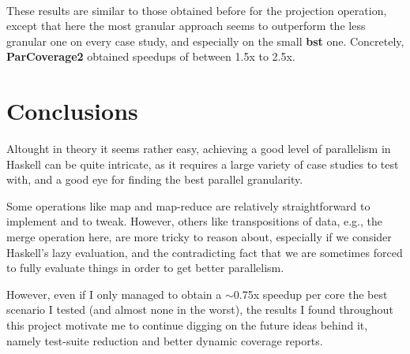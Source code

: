 \documentclass[a4paper,10pt]{article}
\begin{document}
{
}\\

These results are similar to those obtained before for the projection operation,
except that here the most granular approach seems to outperform the less
granular one on every case study, and especially on the small \textbf{bst} one.
%
Concretely, \textbf{ParCoverage2} obtained speedups of between 1.5x to 2.5x.

\section*{Conclusions}

Altought in theory it seems rather easy, achieving a good level of parallelism
in Haskell can be quite intricate, as it requires a large variety of case
studies to test with, and a good eye for finding the best parallel granularity.

Some operations like map and map-reduce are relatively straightforward to
implement and to tweak.
%
However, others like transpositions of data, e.g., the merge operation here, are
more tricky to reason about, especially if we consider Haskell's lazy
evaluation, and the contradicting fact that we are sometimes forced to fully
evaluate things in order to get better parallelism.

However, even if I only managed to obtain a $\sim$0.75x speedup per core the
best scenario I tested (and almost none in the worst), the results I found
throughout this project motivate me to continue digging on the future ideas
behind it, namely test-suite reduction and better dynamic coverage reports.
\end{document}
